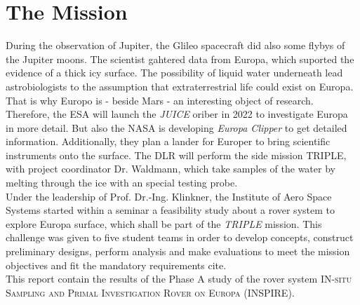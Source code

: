 %
%
%
\chapter{The Mission}
\label{chap:mission}

During the observation  of Jupiter, the Glileo spacecraft did also some flybys of the Jupiter moons.
The scientist gahtered data from Europa, which suported the evidence of a thick icy surface.
The possibility of liquid water underneath lead astrobiologists to the assumption that extraterrestrial life could exist on Europa.
That is why Europo is - beside Mars - an interesting object of research.\\

Therefore, the ESA will launch the \textit{JUICE} oriber in 2022 to investigate Europa in more detail. 
But also the NASA is developing  \textit{Europa Clipper} to get detailed information.
Additionally, they plan a lander for Europer to bring scientific instruments onto the surface.
The DLR will perform the side mission TRIPLE, with project coordinator Dr. Waldmann, which take samples of the water by melting through the ice with an special testing probe.\\

Under the leadership of  Prof. Dr.-Ing. Klinkner, the Institute of Aero Space Systems started within a seminar a feasibility study about a rover system to explore Europa surface, which shall  be part of the \textit{TRIPLE} mission.
This challenge was given to five student teams in order to develop concepts, construct preliminary designs, perform analysis and make evaluations to  meet the mission objectives and fit the mandatory requirements cite. \\


This report contain the results of the Phase A study of the rover system \textsc{IN-situ Sampling and Primal Investigation Rover on Europa}  (INSPIRE).